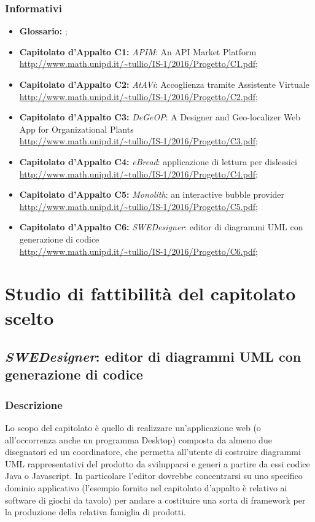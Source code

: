 		\subsubsection{Informativi}
		\begin{itemize}
			\item \textbf{Glossario: }\emph{\Glossario};
			\item \textbf{Capitolato d'Appalto C1:} \emph{APIM}: An API Market Platform
			\\ \url{http://www.math.unipd.it/~tullio/IS-1/2016/Progetto/C1.pdf};
			\item \textbf{Capitolato d'Appalto C2:} \emph{AtAVi}: Accoglienza tramite Assistente Virtuale
			\\ \url{http://www.math.unipd.it/~tullio/IS-1/2016/Progetto/C2.pdf};
			\item \textbf{Capitolato d'Appalto C3:} \emph{DeGeOP}: A Designer and Geo-localizer Web App for Organizational Plants
			\\ \url{http://www.math.unipd.it/~tullio/IS-1/2016/Progetto/C3.pdf};
			\item \textbf{Capitolato d'Appalto C4:} \emph{eBread}: applicazione di lettura per dislessici
			\\ \url{http://www.math.unipd.it/~tullio/IS-1/2016/Progetto/C4.pdf};
			\item \textbf{Capitolato d'Appalto C5:} \emph{Monolith}: an interactive bubble provider
			\\ \url{http://www.math.unipd.it/~tullio/IS-1/2016/Progetto/C5.pdf};
			\item \textbf{Capitolato d'Appalto C6:} \emph{SWEDesigner}: editor di diagrammi UML con generazione di codice
			\\ \url{http://www.math.unipd.it/~tullio/IS-1/2016/Progetto/C6.pdf};
		\end{itemize}
\newpage
	
\section{Studio di fattibilità del capitolato scelto}
	\subsection{\emph{SWEDesigner}: editor di diagrammi UML con generazione di codice}
		\subsubsection{Descrizione}
		Lo scopo del capitolato è quello di realizzare un'applicazione web (o all'occorrenza anche un programma Desktop) composta da almeno due disegnatori
		ed un coordinatore, che permetta all'utente di costruire diagrammi UML rappresentativi del prodotto da svilupparsi e generi a partire da essi codice 
		Java o Javascript.
		In particolare l'editor dovrebbe concentrarsi su uno specifico dominio applicativo (l'esempio fornito nel capitolato d'appalto è relativo ai software 
		di giochi da tavolo) per andare a costituire una sorta di framework per la produzione della relativa famiglia di prodotti.
